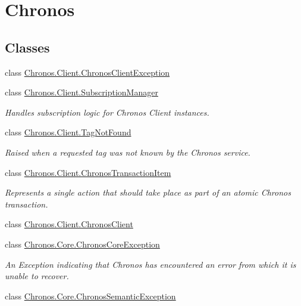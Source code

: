 \hypertarget{group__Chronos}{}\section{Chronos}
\label{group__Chronos}
\subsection*{Classes}
\begin{DoxyCompactItemize}
\item 
class \hyperlink{classChronos_1_1Client_1_1ChronosClientException}{Chronos.\+Client.\+Chronos\+Client\+Exception}
\item 
class \hyperlink{classChronos_1_1Client_1_1SubscriptionManager}{Chronos.\+Client.\+Subscription\+Manager}
\begin{DoxyCompactList}\small\item\em Handles subscription logic for Chronos Client instances. \end{DoxyCompactList}\item 
class \hyperlink{classChronos_1_1Client_1_1TagNotFound}{Chronos.\+Client.\+Tag\+Not\+Found}
\begin{DoxyCompactList}\small\item\em Raised when a requested tag was not known by the Chronos service. \end{DoxyCompactList}\item 
class \hyperlink{classChronos_1_1Client_1_1ChronosTransactionItem}{Chronos.\+Client.\+Chronos\+Transaction\+Item}
\begin{DoxyCompactList}\small\item\em Represents a single action that should take place as part of an atomic Chronos transaction. \end{DoxyCompactList}\item 
class \hyperlink{classChronos_1_1Client_1_1ChronosClient}{Chronos.\+Client.\+Chronos\+Client}
\item 
class \hyperlink{classChronos_1_1Core_1_1ChronosCoreException}{Chronos.\+Core.\+Chronos\+Core\+Exception}
\begin{DoxyCompactList}\small\item\em An Exception indicating that Chronos has encountered an error from which it is unable to recover. \end{DoxyCompactList}\item 
class \hyperlink{classChronos_1_1Core_1_1ChronosSemanticException}{Chronos.\+Core.\+Chronos\+Semantic\+Exception}

\end{DoxyCompactItemize}
